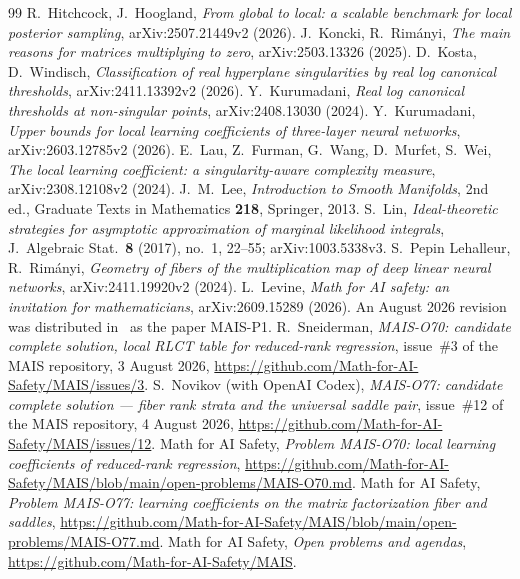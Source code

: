 \documentclass[11pt,a4paper]{article}
\theoremstyle{definition}
\theoremstyle{remark}
\numberwithin{equation}{section}
\begin{document}
\begin{thebibliography}{99}
 R.~Hitchcock, J.~Hoogland, \emph{From global to local: a scalable benchmark for local posterior sampling}, arXiv:2507.21449v2 (2026).
 J.~Koncki, R.~Rimányi, \emph{The main reasons for matrices multiplying to zero}, arXiv:2503.13326 (2025).
 D.~Kosta, D.~Windisch, \emph{Classification of real hyperplane singularities by real log canonical thresholds}, arXiv:2411.13392v2 (2026).
 Y.~Kurumadani, \emph{Real log canonical thresholds at non-singular points}, arXiv:2408.13030 (2024).
 Y.~Kurumadani, \emph{Upper bounds for local learning coefficients of three-layer neural networks}, arXiv:2603.12785v2 (2026).
 E.~Lau, Z.~Furman, G.~Wang, D.~Murfet, S.~Wei, \emph{The local learning coefficient: a singularity-aware complexity measure}, arXiv:2308.12108v2 (2024).
 J.~M.~Lee, \emph{Introduction to Smooth Manifolds}, 2nd ed., Graduate Texts in Mathematics \textbf{218}, Springer, 2013.
 S.~Lin, \emph{Ideal-theoretic strategies for asymptotic approximation of marginal likelihood integrals}, J.\ Algebraic Stat.\ \textbf{8} (2017), no.\ 1, 22--55; arXiv:1003.5338v3.
 S.~Pepin Lehalleur, R.~Rimányi, \emph{Geometry of fibers of the multiplication map of deep linear neural networks}, arXiv:2411.19920v2 (2024).
 L.~Levine, \emph{Math for AI safety: an invitation for mathematicians}, arXiv:2609.15289 (2026). An August 2026 revision was distributed in~\cite{mais-repo} as the paper MAIS-P1.
 R.~Sneiderman, \emph{MAIS-O70: candidate complete solution, local RLCT table for reduced-rank regression}, issue~\#3 of the MAIS repository, 3 August 2026, \url{https://github.com/Math-for-AI-Safety/MAIS/issues/3}.
 S.~Novikov (with OpenAI Codex), \emph{MAIS-O77: candidate complete solution --- fiber rank strata and the universal saddle pair}, issue~\#12 of the MAIS repository, 4 August 2026, \url{https://github.com/Math-for-AI-Safety/MAIS/issues/12}.
 Math for AI Safety, \emph{Problem MAIS-O70: local learning coefficients of reduced-rank regression}, \url{https://github.com/Math-for-AI-Safety/MAIS/blob/main/open-problems/MAIS-O70.md}.
 Math for AI Safety, \emph{Problem MAIS-O77: learning coefficients on the matrix factorization fiber and saddles}, \url{https://github.com/Math-for-AI-Safety/MAIS/blob/main/open-problems/MAIS-O77.md}.
 Math for AI Safety, \emph{Open problems and agendas}, \url{https://github.com/Math-for-AI-Safety/MAIS}.

\end{thebibliography}
\end{document}
